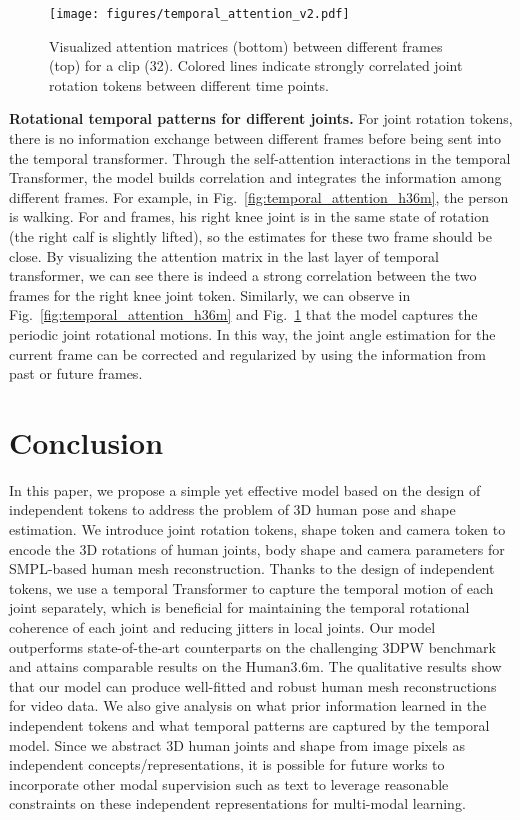 \begin{figure}[h]
	\centering
	\texttt{[image: figures/temporal\_attention\_v2.pdf]}
	\caption{Visualized attention matrices (bottom) between different frames (top) for a clip (32). Colored lines indicate strongly correlated joint rotation tokens between different time points. }
	\label{fig:temporal_attention_posetrack}\vspace{-0.1in}
\end{figure}

{\bf Rotational temporal patterns for different joints.} For joint rotation tokens, there is no information exchange between different frames before being sent into the temporal transformer.
Through the self-attention interactions in the temporal Transformer, the model builds correlation and integrates the information among different frames. For example, in Fig.~\ref{fig:temporal_attention_h36m}, the person is walking. For  and  frames, his right knee joint is in the same state of rotation (the right calf is slightly lifted), so the estimates for these two frame should be close. 
By visualizing the attention matrix in the last layer of temporal transformer, we can see there is indeed a strong correlation between the two frames for the right knee joint token.
Similarly, we can observe in Fig.~\ref{fig:temporal_attention_h36m} and Fig.~\ref{fig:temporal_attention_posetrack} that the model captures the periodic joint rotational motions.  In this way, the joint angle estimation for the current frame can be corrected and regularized by using the information from past or future frames.

\section{Conclusion}
\label{discussion}
In this paper, we propose a simple yet effective model based on the design of independent tokens to address the problem of 3D human pose and shape estimation. We introduce joint rotation tokens, shape token and camera token to encode the 3D rotations of human joints, body shape and camera parameters for SMPL-based human mesh reconstruction. 
Thanks to the design of independent tokens, we use a temporal Transformer to capture the temporal motion of each joint separately, which is beneficial for maintaining the temporal rotational coherence of each joint and reducing jitters in local joints.
Our model outperforms state-of-the-art counterparts on the challenging 3DPW benchmark and attains comparable results on the Human3.6m.
The qualitative results show that our model can produce well-fitted and robust human mesh reconstructions for video data.
We also give analysis on what prior information learned in the independent tokens and what temporal patterns are captured by the temporal model.
Since we abstract 3D human joints and shape from image pixels as independent concepts/representations, it is possible for future works to incorporate other modal supervision such as text to leverage reasonable constraints on these independent representations for multi-modal learning.





